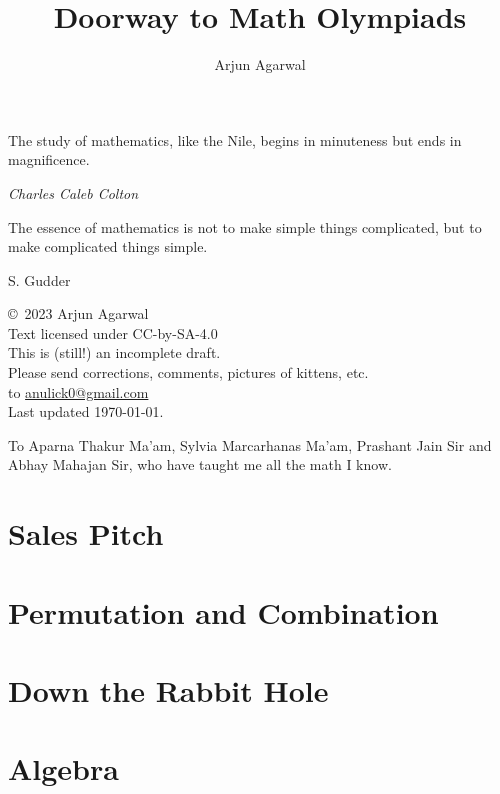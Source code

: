\documentclass{maaprb}
\title{Doorway to Math Olympiads}
\author{Arjun Agarwal}
\begin{document}
\frontmatter
\maketitle
\epigraph{The study of mathematics, like the Nile, begins in minuteness but ends in magnificence.}{\textit{Charles Caleb Colton}}
\epigraph{The essence of mathematics is not to make simple things complicated, but to make complicated things simple.}{S. Gudder}
\pagebreak

\begin{center}
\copyright\ 2023 Arjun Agarwal \\
Text licensed under CC-by-SA-4.0 \\
This is (still!) an incomplete draft. \\
Please send corrections, comments, pictures of kittens, etc. \\
to \href{mailto:anulick0@gmail.com}{anulick0@gmail.com} \\
Last updated \today.
\end{center}
\pagebreak

\thispagestyle{empty}
\vspace*{13.5pc}
\begin{center}
To Aparna Thakur Ma'am, Sylvia Marcarhanas Ma'am, Prashant Jain Sir and Abhay Mahajan Sir, who have taught me all the math I know. 
\end{center}
\pagebreak


\tableofcontents
\mainmatter
\part{Sales Pitch}


\part{Permutation and Combination}





\part{Down the Rabbit Hole}


\part{Algebra}



\end{document}
